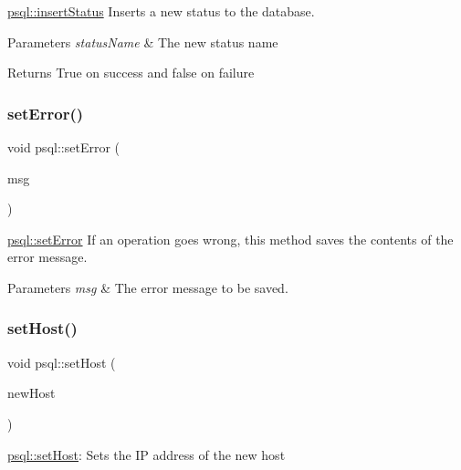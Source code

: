 \hyperlink{classpsql_a601ee0bdc9430b1d674a857f7c94b767}{psql\+::insert\+Status} Inserts a new status to the database. 


\begin{DoxyParams}{Parameters}
{\em status\+Name} & The new status name \\
\hline
\end{DoxyParams}
\begin{DoxyReturn}{Returns}
True on success and false on failure 
\end{DoxyReturn}
\mbox{\label{classpsql_a9a0d5ba32aabe6018a36fb0bc185445b}} 
\subsubsection{\texorpdfstring{set\+Error()}{setError()}}
{\footnotesize\ttfamily void psql\+::set\+Error (\begin{DoxyParamCaption}\item[{Q\+String}]{msg }\end{DoxyParamCaption})}



\hyperlink{classpsql_a9a0d5ba32aabe6018a36fb0bc185445b}{psql\+::set\+Error} If an operation goes wrong, this method saves the contents of the error message. 


\begin{DoxyParams}{Parameters}
{\em msg} & The error message to be saved. \\
\hline
\end{DoxyParams}
\mbox{\label{classpsql_a96b3b9483f1a642c026d4b5cf505eb75}} 
\subsubsection{\texorpdfstring{set\+Host()}{setHost()}}
{\footnotesize\ttfamily void psql\+::set\+Host (\begin{DoxyParamCaption}\item[{Q\+String}]{new\+Host }\end{DoxyParamCaption})}



\hyperlink{classpsql_a96b3b9483f1a642c026d4b5cf505eb75}{psql\+::set\+Host}\+: Sets the IP address of the new host 


